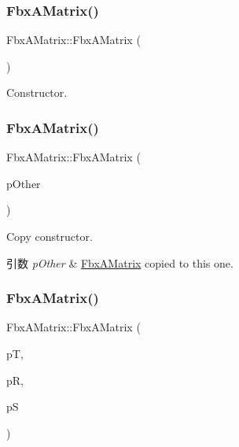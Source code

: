 \subsubsection{\texorpdfstring{Fbx\+A\+Matrix()}{FbxAMatrix()}\hspace{0.1cm}{\footnotesize\ttfamily [1/4]}}
{\footnotesize\ttfamily Fbx\+A\+Matrix\+::\+Fbx\+A\+Matrix (\begin{DoxyParamCaption}{ }\end{DoxyParamCaption})}



Constructor. 

\mbox{\label{class_fbx_a_matrix_a610a8cdf2f914285630decbf576d77ab}} 
\subsubsection{\texorpdfstring{Fbx\+A\+Matrix()}{FbxAMatrix()}\hspace{0.1cm}{\footnotesize\ttfamily [2/4]}}
{\footnotesize\ttfamily Fbx\+A\+Matrix\+::\+Fbx\+A\+Matrix (\begin{DoxyParamCaption}\item[{const \hyperlink{class_fbx_a_matrix}{Fbx\+A\+Matrix} \&}]{p\+Other }\end{DoxyParamCaption})}

Copy constructor. 
\begin{DoxyParams}{引数}
{\em p\+Other} & \hyperlink{class_fbx_a_matrix}{Fbx\+A\+Matrix} copied to this one. \\
\hline
\end{DoxyParams}
\mbox{\label{class_fbx_a_matrix_a0771e5745b856c562c6415d83e331d15}} 
\subsubsection{\texorpdfstring{Fbx\+A\+Matrix()}{FbxAMatrix()}\hspace{0.1cm}{\footnotesize\ttfamily [3/4]}}
{\footnotesize\ttfamily Fbx\+A\+Matrix\+::\+Fbx\+A\+Matrix (\begin{DoxyParamCaption}\item[{const \hyperlink{class_fbx_vector4}{Fbx\+Vector4} \&}]{pT,  }\item[{const \hyperlink{class_fbx_vector4}{Fbx\+Vector4} \&}]{pR,  }\item[{const \hyperlink{class_fbx_vector4}{Fbx\+Vector4} \&}]{pS }\end{DoxyParamCaption})}

